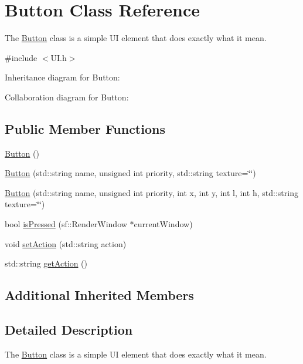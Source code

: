 \hypertarget{class_button}{\section{Button Class Reference}
\label{class_button}
}


The \hyperlink{class_button}{Button} class is a simple U\-I element that does exactly what it mean.  




{\ttfamily \#include $<$U\-I.\-h$>$}



Inheritance diagram for Button\-:


Collaboration diagram for Button\-:
\subsection*{Public Member Functions}
\begin{DoxyCompactItemize}
\item 
\hyperlink{class_button_a3b36df1ae23c58aedb9e15a713159459}{Button} ()
\item 
\hyperlink{class_button_a08181944cf12e0e960ba74bdf7cef98e}{Button} (std\-::string name, unsigned int priority, std\-::string texture=\char`\"{}\char`\"{})
\item 
\hyperlink{class_button_a766ec36861fcbc9cba9829dd68164b73}{Button} (std\-::string name, unsigned int priority, int x, int y, int l, int h, std\-::string texture=\char`\"{}\char`\"{})
\item 
bool \hyperlink{class_button_af0c0bca46462e357cd32d007d93d660c}{is\-Pressed} (sf\-::\-Render\-Window $\ast$current\-Window)
\item 
void \hyperlink{class_button_a0d037b742c501f7deb1b4da1a2f3c2a8}{set\-Action} (std\-::string action)
\item 
std\-::string \hyperlink{class_button_a7aafbc7deaf432112e14e9738a2e649a}{get\-Action} ()
\end{DoxyCompactItemize}
\subsection*{Additional Inherited Members}


\subsection{Detailed Description}
The \hyperlink{class_button}{Button} class is a simple U\-I element that does exactly what it mean. 

